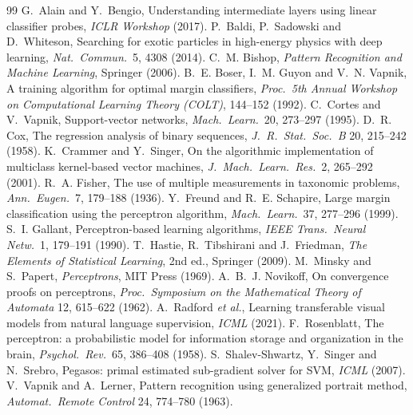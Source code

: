 \documentclass[11pt]{article}
\begin{document}
\begin{thebibliography}{99}\small
{} G.~Alain and Y.~Bengio, Understanding intermediate layers using linear classifier probes, \emph{ICLR Workshop} (2017).
 P.~Baldi, P.~Sadowski and D.~Whiteson, Searching for exotic particles in high-energy physics with deep learning, \emph{Nat.\ Commun.}\ 5, 4308 (2014).
 C.~M. Bishop, \emph{Pattern Recognition and Machine Learning}, Springer (2006).
 B.~E. Boser, I.~M. Guyon and V.~N. Vapnik, A training algorithm for optimal margin classifiers, \emph{Proc.\ 5th Annual Workshop on Computational Learning Theory (COLT)}, 144--152 (1992).
 C.~Cortes and V.~Vapnik, Support-vector networks, \emph{Mach.\ Learn.}\ 20, 273--297 (1995).
 D.~R. Cox, The regression analysis of binary sequences, \emph{J.\ R.\ Stat.\ Soc.\ B} 20, 215--242 (1958).
 K.~Crammer and Y.~Singer, On the algorithmic implementation of multiclass kernel-based vector machines, \emph{J.\ Mach.\ Learn.\ Res.}\ 2, 265--292 (2001).
 R.~A. Fisher, The use of multiple measurements in taxonomic problems, \emph{Ann.\ Eugen.}\ 7, 179--188 (1936).
 Y.~Freund and R.~E. Schapire, Large margin classification using the perceptron algorithm, \emph{Mach.\ Learn.}\ 37, 277--296 (1999).
 S.~I. Gallant, Perceptron-based learning algorithms, \emph{IEEE Trans.\ Neural Netw.}\ 1, 179--191 (1990).
 T.~Hastie, R.~Tibshirani and J.~Friedman, \emph{The Elements of Statistical Learning}, 2nd ed., Springer (2009).
 M.~Minsky and S.~Papert, \emph{Perceptrons}, MIT Press (1969).
 A.~B.~J. Novikoff, On convergence proofs on perceptrons, \emph{Proc.\ Symposium on the Mathematical Theory of Automata} 12, 615--622 (1962).
 A.~Radford \emph{et al.}, Learning transferable visual models from natural language supervision, \emph{ICML} (2021).
 F.~Rosenblatt, The perceptron: a probabilistic model for information storage and organization in the brain, \emph{Psychol.\ Rev.}\ 65, 386--408 (1958).
 S.~Shalev-Shwartz, Y.~Singer and N.~Srebro, Pegasos: primal estimated sub-gradient solver for SVM, \emph{ICML} (2007).
 V.~Vapnik and A.~Lerner, Pattern recognition using generalized portrait method, \emph{Automat.\ Remote Control} 24, 774--780 (1963).
\end{thebibliography}

\SourceNote
\end{document}
